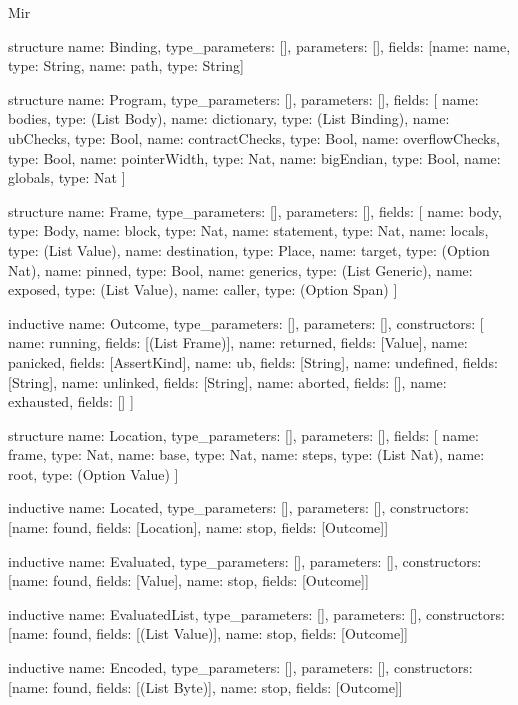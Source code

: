 \begin{lexlean}{Mir}
\begin{semanticmodule}
structure{
  name: Binding,
  type_parameters: [],
  parameters: [],
  fields: [{name: name, type: String}, {name: path, type: String}]
}

structure{
  name: Program,
  type_parameters: [],
  parameters: [],
  fields: [
    {name: bodies, type: (List Body)},
    {name: dictionary, type: (List Binding)},
    {name: ubChecks, type: Bool},
    {name: contractChecks, type: Bool},
    {name: overflowChecks, type: Bool},
    {name: pointerWidth, type: Nat},
    {name: bigEndian, type: Bool},
    {name: globals, type: Nat}
  ]
}

structure{
  name: Frame,
  type_parameters: [],
  parameters: [],
  fields: [
    {name: body, type: Body},
    {name: block, type: Nat},
    {name: statement, type: Nat},
    {name: locals, type: (List Value)},
    {name: destination, type: Place},
    {name: target, type: (Option Nat)},
    {name: pinned, type: Bool},
    {name: generics, type: (List Generic)},
    {name: exposed, type: (List Value)},
    {name: caller, type: (Option Span)}
  ]
}

inductive{
  name: Outcome,
  type_parameters: [],
  parameters: [],
  constructors: [
    {name: running, fields: [(List Frame)]},
    {name: returned, fields: [Value]},
    {name: panicked, fields: [AssertKind]},
    {name: ub, fields: [String]},
    {name: undefined, fields: [String]},
    {name: unlinked, fields: [String]},
    {name: aborted, fields: []},
    {name: exhausted, fields: []}
  ]
}

structure{
  name: Location,
  type_parameters: [],
  parameters: [],
  fields: [
    {name: frame, type: Nat},
    {name: base, type: Nat},
    {name: steps, type: (List Nat)},
    {name: root, type: (Option Value)}
  ]
}

inductive{
  name: Located,
  type_parameters: [],
  parameters: [],
  constructors: [{name: found, fields: [Location]}, {name: stop, fields: [Outcome]}]
}

inductive{
  name: Evaluated,
  type_parameters: [],
  parameters: [],
  constructors: [{name: found, fields: [Value]}, {name: stop, fields: [Outcome]}]
}

inductive{
  name: EvaluatedList,
  type_parameters: [],
  parameters: [],
  constructors: [{name: found, fields: [(List Value)]}, {name: stop, fields: [Outcome]}]
}

inductive{
  name: Encoded,
  type_parameters: [],
  parameters: [],
  constructors: [{name: found, fields: [(List Byte)]}, {name: stop, fields: [Outcome]}]
}


\end{semanticmodule}
\end{lexlean}
